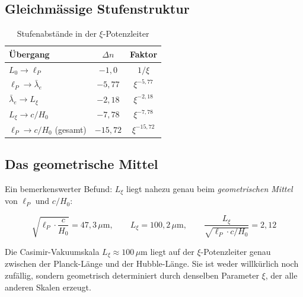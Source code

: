 \subsection{Gleichmässige Stufenstruktur}

\begin{table}[H]
    \centering
    \caption{Stufenabstände in der $\xi$-Potenzleiter}
    \label{tab:steps}
    \begin{tabular}{lcc}
        \toprule
        \textbf{Übergang} & \textbf{$\Delta n$} & \textbf{Faktor} \\
        \midrule
        $L_0 \to \ell_P$        & $-1{,}0$ & $1/\xi$            \\
        $\ell_P \to \bar\lambda_e$ & $-5{,}77$ & $\xi^{-5{,}77}$ \\
        $\bar\lambda_e \to L_\xi$ & $-2{,}18$ & $\xi^{-2{,}18}$ \\
        $L_\xi \to c/H_0$        & $-7{,}78$ & $\xi^{-7{,}78}$ \\
        \midrule
        $\ell_P \to c/H_0$ (gesamt) & $-15{,}72$ & $\xi^{-15{,}72}$ \\
        \bottomrule
    \end{tabular}
\end{table}

\subsection{Das geometrische Mittel}

Ein bemerkenswerter Befund: $L_\xi$ liegt nahezu genau beim
\emph{geometrischen Mittel} von $\ell_P$ und $c/H_0$:

\begin{equation}
    \sqrt{\ell_P \cdot \frac{c}{H_0}} = 47{,}3\,\mu\text{m},
    \qquad
    L_\xi = 100{,}2\,\mu\text{m},
    \qquad
    \frac{L_\xi}{\sqrt{\ell_P \cdot c/H_0}} = 2{,}12
    \label{eq:geom_mean}
\end{equation}

\begin{insightBox}
    Die Casimir-Vakuumskala $L_\xi \approx 100\,\mu\text{m}$ liegt auf der
    $\xi$-Potenzleiter genau zwischen der Planck-Länge und der Hubble-Länge.
    Sie ist weder willkürlich noch zufällig, sondern geometrisch determiniert
    durch denselben Parameter $\xi$, der alle anderen Skalen erzeugt.
\end{insightBox}

